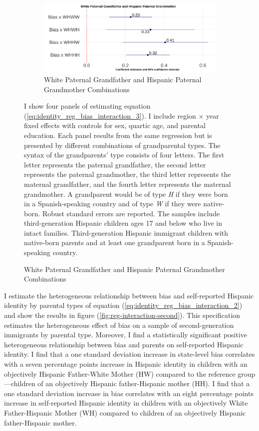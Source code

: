 \documentclass[12pt, fullpage]{article}
\newcommand{\note}[1]{\flushleft\footnotesize{#1}}
\begin{document}
\begin{figure}[H]
\begin{subfigure}{.48\textwidth}
\end{subfigure}
\begin{subfigure}{.48\textwidth}
\centering
\caption{White Paternal Grandfather and Hispanic Paternal Grandmother Combinations}
\label{fig:reg-interaction-third-d}
\includegraphics[width=.9\linewidth]{figure/skin-iat-regression-interaction-bygen-plot-WH.png}
\end{subfigure}
\flushleft\footnotesize{\note{I show four panels of estimating equation (\ref{eq:identity_reg_bias_interaction_3}). I include region $\times$ year fixed effects with controls for sex, quartic age, and parental education. Each panel results from the same regression but is presented by different combinations of grandparental types. The syntax of the grandparents' type consists of four letters. The first letter represents the paternal grandfather, the second letter represents the paternal grandmother, the third letter represents the maternal grandfather, and the fourth letter represents the maternal grandmother. A grandparent would be of type \textit{H} if they were born in a Spanish-speaking country and of type \textit{W} if they were native-born. Robust standard errors are reported. The samples include third-generation Hispanic children ages 17 and below who live in intact families. Third-generation Hispanic immigrant children with native-born parents and at least one grandparent born in a Spanish-speaking country.}}
\end{figure}

I estimate the heterogeneous relationship between bias and self-reported Hispanic identity by parental types of equation (\ref{eq:identity_reg_bias_interaction_2}) and show the results in figure (\ref{fig:reg-interaction-second}). This specification estimates the heterogeneous effect of bias on a sample of second-generation immigrants by parental type. Moreover, I find a statistically significant positive heterogeneous relationship between bias and parents on self-reported Hispanic identity. I find that a one standard deviation increase in state-level bias correlates with a seven percentage points increase in Hispanic identity in children with an objectively Hispanic Father-White Mother (HW) compared to the reference group---children of an objectively Hispanic father-Hispanic mother (HH). I find that a one standard deviation increase in bias correlates with an eight percentage points increase in self-reported Hispanic identity in children with an objectively White Father-Hispanic Mother (WH) compared to children of an objectively Hispanic father-Hispanic mother.
\end{document}
